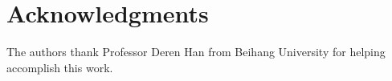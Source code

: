 \section*{Acknowledgments}


The authors thank Professor Deren Han from Beihang University for helping accomplish this work.
